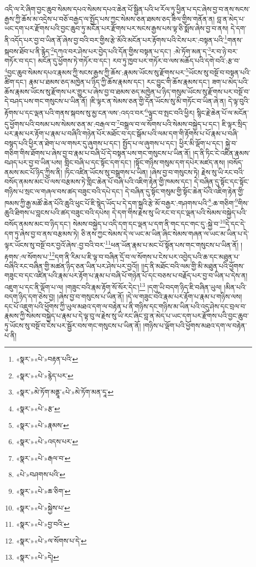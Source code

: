 འདི་ལ་རེ་ཞིག་བྱང་ཆུབ་སེམས་དཔའ་སེམས་དཔའ་ཆེན་པོ་སྦྱིན་པའི་ཕ་རོལ་ཏུ་ཕྱིན་པ་དང་ཞེས་བྱ་བ་ནས་སངས་རྒྱས་ཀྱི་ཆོས་མ་འདྲེས་པ་བཅོ་བརྒྱད་ལ་སྤྱོད་པས་ཀྱང་སེམས་ཅན་ཐམས་ཅད་ཟིལ་གྱིས་གནོན་ན། བླ་ན་མེད་པ་ཡང་དག་པར་རྫོགས་པའི་བྱང་ཆུབ་ཏུ་མངོན་པར་རྫོགས་པར་སངས་རྒྱས་པས་ལྟ་ཅི་སྨོས་ཞེས་བྱ་བ་ནས། དེ་དག་ནི་འདོད་པར་བྱ་བ་ཡིན་ནོ་ཞེས་བྱ་བའི་བར་གྱིས་རྩེ་མོའི་མངོན་པར་རྟོགས་པའི་ངེས་པར་:བསྟན་པའི་\footnote{«སྣར་»«པེ་»བརྟན་པའི་}གནས་སྐབས་ཐོབ་པ་ནི་རྙེད་\footnote{«སྣར་»«པེ་»རྙེད་པར་}དཀའ་བར་ཤེས་པར་བྱེད་པའི་དོན་གྱིས་བསྟན་པ་དང་། :མེ་ཏོག་མན་ད་\footnote{«སྣར་»མེ་ཏོག་མནྡཱ་«པེ་»མེ་ཏོག་མན་དཱ་}ར་བ་ཉེ་བར་གཏོར་བ་དང་། མངོན་དུ་ཕྱོགས་ཏེ་གཏོར་བ་དང་། རབ་ཏུ་ཁྱབ་པར་གཏོར་བ་ལས་མཆོད་པའི་དགེ་བའི་:རྩ་བ་\footnote{«སྣར་»«པེ་»རྩ་}བྱང་ཆུབ་སེམས་དཔའ་རྣམས་ཀྱི་སངས་རྒྱས་ཀྱི་ཆོས་:རྣམས་ཡོངས་སུ་རྫོགས་པར་\footnote{«སྣར་»«པེ་»རྣམས་}ཡོངས་སུ་བསྔོ་བ་བསྟན་པའི་ཚིག་དང་། རྣམ་པ་ཐམས་ཅད་མཁྱེན་པ་ཉིད་ཀྱི་ཆོས་རྣམས་དང་། རང་བྱུང་གི་ཆོས་རྣམས་དང་། ཟག་པ་མེད་པའི་ཆོས་རྣམས་ཡོངས་སུ་རྫོགས་པར་གྱུར་པ་ཞེས་བྱ་བ་ཐམས་ཅད་མཁྱེན་པ་ཉིད་གསུམ་ཡོངས་སུ་རྫོགས་པར་བསྔོ་བ་དེ་བཤད་པས་གང་གསུངས་པ་ཡིན་ནོ། །ཇི་ལྟར་ན་སེམས་ཅན་གྱི་དོན་ཡོངས་སུ་མི་གཏོང་བ་ཡིན་ཞེ་ན། དེ་ལྟ་བུའི་རྟོགས་པ་དང་ལྡན་པའི་གནས་སྐབས་སུ་མྱ་ངན་ལས་:འདའ་བར་\footnote{«སྣར་»«པེ་»འདས་པར་}ལྟུང་བ་སྤང་བའི་ཕྱིར། སྙིང་རྗེ་ཆེན་པོ་ལ་མངོན་དུ་ཕྱོགས་པའི་བསམ་པས་སེམས་ཅན་མ་:བརྒལ་བ་\footnote{«སྣར་»«པེ་»རྒལ་བ་}བསྒྲལ་བ་ལ་སོགས་པའི་སེམས་བསྐྱེད་པ་དང་། ཇི་ལྟར་སྲིད་པར་རྣམ་པར་རྟོག་པ་རྣམ་པ་བཞིའི་གཉེན་པོར་མཐོང་བ་དང་སྒོམ་པའི་ལམ་དག་གི་རྟོགས་པ་པོ་རྣམ་པ་བཞི་བསྙད་པའི་ཕྱིར་ན་ཐེག་པ་ལ་གསར་དུ་ཞུགས་པ་དང་། སྤྱོད་པ་ལ་ཞུགས་པ་དང་། ཕྱིར་མི་ལྡོག་པ་དང་། སྐྱེ་བ་གཅིག་གིས་ཐོགས་པ་ཞེས་བྱ་བ་རྣམ་པ་བཞི་པོ་དེ་བསྟན་པས་གང་གསུངས་པ་ཡིན་ནོ། །ད་ནི་ཏིང་ངེ་འཛིན་རྣམས་བཤད་པར་བྱ་བ་ཡིན་པས། གླིང་བཞི་པ་དང་སྟོང་དག་དང་། །སྟོང་གཉིས་གསུམ་དག་དཔེར་མཛད་ནས། །བསོད་ནམས་མང་པོ་ཉིད་ཀྱིས་ནི། །ཏིང་འཛིན་ཡོངས་སུ་བསྒྲགས་པ་ཡིན། །ཞེས་བྱ་བ་གསུངས་ཏེ། རྗེས་སུ་ཡི་རང་བའི་བསོད་ནམས་མང་པོ་ལས་བརྩམས་ཏེ་གླིང་ཆེན་པོ་བཞི་པའི་འཇིག་རྟེན་གྱི་ཁམས་དང་། དེ་བཞིན་དུ་སྟོང་དང་སྟོང་གཉིས་པ་སྲང་ལ་གཞལ་བས་ཚད་བཟུང་བའི་དཔེ་དང་། དེ་བཞིན་དུ་སྟོང་གསུམ་གྱི་སྟོང་ཆེན་པོའི་འཇིག་རྟེན་གྱི་ཁམས་ཀྱི་རྒྱ་མཚོ་ཆེན་པོའི་ཆུའི་ཕུང་པོ་ཇི་སྙེད་ཡོད་པ་དེ་དག་སྐྲའི་རྩེ་མོ་བརྒྱར་:གཤགས་པའི་\footnote{«པེ་»བཤགས་པའི་}:ཆ་གཅིག་\footnote{«སྣར་»«པེ་»ཆ་ཅིག་}གིས་ཆུའི་ཐིགས་པ་བླངས་པའི་ཚད་བཟུང་བའི་དཔེས། དེ་དག་གིས་རྗེས་སུ་ཡི་རང་བ་དང་ལྡན་པའི་སེམས་བསྐྱེད་པའི་བསོད་ནམས་མང་བ་ཉིད་དང་། སེམས་བསྐྱེད་པ་འདི་དག་དང་ལྡན་པ་དག་ནི་གང་དང་གང་དུ་:སྐྱེ་བ་\footnote{«སྣར་»«པེ་»སྐྱེས་པ་}དེ་དང་དེ་དག་ཏུ་ཞེས་བྱ་བ་ནས་བརྩམས་ཏེ། ཅི་ནས་ཀྱང་སེམས་དེ་ལ་ཡང་མ་ཡིན་ཞིང་སེམས་གཞན་ལ་ཡང་མ་ཡིན་པ་དེ་ལྟར་ཡོངས་སུ་བསྔོ་བར་བྱའོ་ཞེས་:བྱ་བའི་བར་\footnote{«སྣར་»«པེ་»བྱ་བའི་}ཕན་ཡོན་རྣམ་པ་མང་པོ་སྟོན་པས་གང་གསུངས་པ་ཡིན་ནོ། །རྟགས་:ལ་སོགས་པ་\footnote{«སྣར་»«པེ་»ལ་སོགས་པ་དེ་}དག་ནི་རིམ་པ་ཇི་ལྟ་བ་བཞིན་དྲོ་བ་ལ་སོགས་པ་ངེས་པར་འབྱེད་པའི་ཆ་དང་མཐུན་པ་བཞིའི་རང་བཞིན་གྱི་མཚན་ཉིད་ཅན་ཡིན་པར་ཤེས་པར་བྱའོ།། །།ད་ནི་མཐོང་བའི་ལམ་གྱི་མི་མཐུན་པའི་ཕྱོགས་གཟུང་བ་དང་འཛིན་པའི་རྣམ་པར་རྟོག་པ་རྣམ་པ་བཞི་པོ་གཉེན་པོ་དང་བཅས་པ་བརྗོད་པར་བྱ་བ་ཡིན་པ་དེས་ན། འཇུག་པ་དང་ནི་ལྡོག་པ་ལ། །གཟུང་བའི་རྣམ་རྟོག་སོ་སོར་དེང་།\footnote{«སྣར་»«པེ་»དེ།} །དགུ་ཡི་བདག་ཉིད་ཇི་བཞིན་ཡུལ། །མིན་པའི་བདག་ཉིད་དག་ཅེས་བྱ། །ཞེས་བྱ་བ་གསུངས་པ་ཡིན་ནོ། །དེ་ལ་གཟུང་བའི་རྣམ་པར་རྟོག་པ་རྣམ་པ་གཉིས་ལས། དང་པོ་འཇུག་པའི་ཕྱོགས་ཀྱི་ཡུལ་མཐའ་དག་ལ་བརྟེན་པ་ནི་གཉིས་དང་གཉིས་མ་ཡིན་པའི་འདུ་ཤེས་དང་བྲལ་བ་རྣམས་ཀྱི་སེམས་བསྐྱེད་པ་རྣམ་པ་དེ་ལྟ་བུ་ལ་རྗེས་སུ་ཡི་རང་ཞིང་བླ་ན་མེད་པ་ཡང་དག་པར་རྫོགས་པའི་བྱང་ཆུབ་ཏུ་ཡོངས་སུ་བསྔོ་བ་ངེས་པར་སྦྱོར་བས་གང་གསུངས་པ་ཡིན་ནོ། །གཉིས་པ་ལྡོག་པའི་ཕྱོགས་མཐའ་དག་ལ་བརྟེན་པ་ནི། 